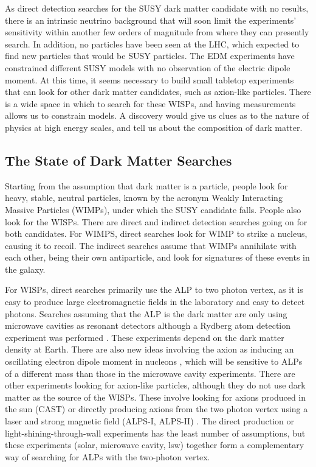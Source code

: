 \documentclass[12pt,twosides]{book}
\begin{document}
\begin{description}
As direct detection searches for  the SUSY dark matter candidate with no results, there is an intrinsic neutrino background that will soon limit the experiments' sensitivity within another few orders of magnitude from where they can presently search. In addition, no particles have been seen at the LHC, which expected to find new particles that would be SUSY particles. The EDM experiments have constrained different SUSY models with no observation of the electric dipole moment. At this time, it seems necessary to build small tabletop experiments that can look for other dark matter candidates, such as axion-like particles. There is a wide space in which to search for these WISPs, and having measurements allows us to constrain models. A discovery would give us clues as to the nature of physics at high energy scales, and tell us about the composition of dark matter.

\subsection{The State of Dark Matter Searches}

Starting from the assumption that dark matter is a particle, people look for heavy, stable, neutral particles, known by the acronym Weakly Interacting Massive Particles (WIMPs), under which the SUSY candidate falls. People also look for the WISPs. There are direct and indirect detection searches going on for both candidates. For WIMPS, direct searches look for WIMP to strike a nucleus, causing it to recoil. The indirect searches assume that WIMPs annihilate with each other, being their own antiparticle, and look for signatures of these events in the galaxy.

For WISPs, direct searches primarily use the ALP to two photon vertex, as it is easy to produce large electromagnetic fields in the laboratory and easy to detect photons. Searches assuming that the ALP is the dark matter are only using microwave cavities as resonant detectors \cite{admx10} although a Rydberg atom detection experiment was performed \cite{yamamoto00}. These experiments depend on the dark matter density at Earth. There are also new ideas involving the axion as inducing an oscillating electron dipole moment in nucleons \cite{budker13}, which will be sensitive to  ALPs of a different mass than those in the microwave cavity experiments. There are other experiments looking for axion-like particles, although they do not use dark matter as the source of the WISPs. These involve looking for axions produced in the sun (CAST) \cite{cast11} or directly producing axions from the two photon vertex using a laser and strong magnetic field (ALPS-I, ALPS-II) \cite{ehret10}. The direct production or light-shining-through-wall experiments has the least number of assumptions, but these experiments (solar, microwave cavity, lsw) together form a complementary way of searching for ALPs with the two-photon vertex.


\end{description}
\end{document}
